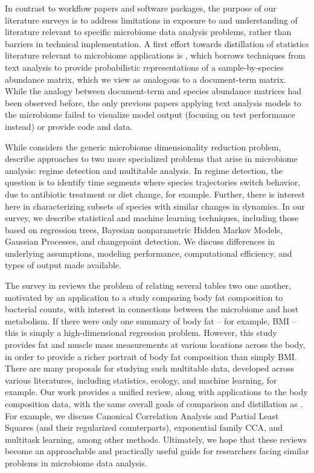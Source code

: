 \documentclass{article}
\begin{document}
In contrast to workflow papers and software packages, the purpose of our
literature surveys is to address limitations in exposure to and understanding of
literature relevant to specific microbiome data analysis problems, rather than
barriers in technical implementation. A first effort towards distillation of
statistics literature relevant to microbiome applications is
\citep{sankaran2017latent}, which borrows techniques from text analysis to
provide probabilistic representations of a sample-by-species abundance matrix,
which we view as analogous to a document-term matrix. While the analogy between
document-term and species abundance matrices had been observed before, the only
previous papers applying text analysis models to the microbiome failed to
visualize model output (focusing on test performance instead) or provide code
and data.

While \citep{sankaran2017latent} considers the generic microbiome dimensionality
reduction problem, \citep{sankaran2017inference, sankaran2017survey} describe
approaches to two more specialized problems that arise in microbiome analysis:
regime detection and multitable analysis. In regime detection, the question is
to identify time segments where species trajectories switch behavior, due to
antibiotic treatment or diet change, for example. Further, there is interest
here in characterizing subsets of species with similar changes in dynamics. In
our survey, we describe statistical and machine learning techniques, including
those based on regression trees, Bayesian nonparametric Hidden Markov Models,
Gaussian Processes, and changepoint detection. We discuss differences in
underlying assumptions, modeling performance, computational efficiency, and
types of output made available.

The survey in \citep{sankaran2017survey} reviews the problem of relating several
tables two one another, motivated by an application to a study comparing body
fat composition to bacterial counts, with interest in connections between the
microbiome and host metabolism. If there were only one summary of body fat --
for example, BMI -- this is simply a high-dimensional regression problem.
However, this study provides fat and muscle mass measurements at various
locations across the body, in order to provide a richer portrait of body fat
composition than simply BMI. There are many proposals for studying such
multitable data, developed across various literatures, including statistics,
ecology, and machine learning, for example. Our work provides a unified review,
along with applications to the body composition data, with the same overall
goals of comparison and distillation as \citep{sankaran2017inference}. For
example, we discuss Canonical Correlation Analysis and Partial Least Squares
(and their regularized counterparts), exponential family CCA, and multitask
learning, among other methods. Ultimately, we hope that these reviews become an
approachable and practically useful guide for researchers facing similar
problems in microbiome data analysis.
\end{document}
